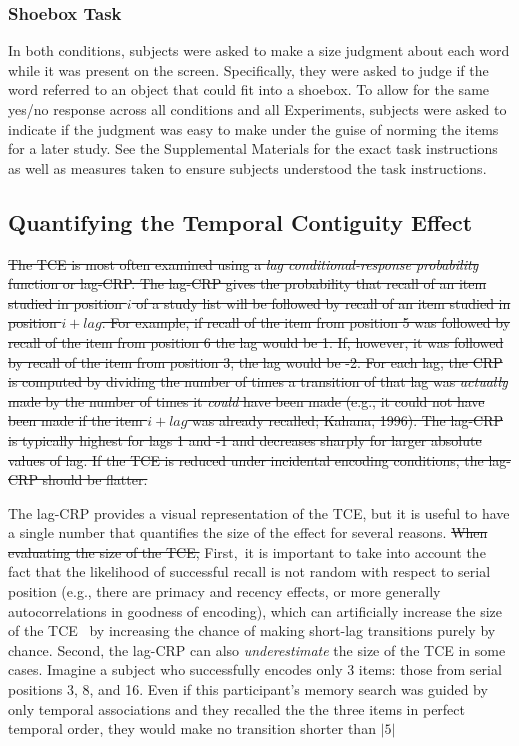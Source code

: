 \documentclass[man,natbib,floatsintext]{apa6} %
\begin{document}
\subsubsection{Shoebox Task} In both conditions, subjects were asked to make a size judgment about each word while it was present on the screen. Specifically, they were asked  to judge if the word referred to an object that could fit into a shoebox. To allow for the same yes/no response across all conditions and all Experiments, subjects were asked to indicate if the judgment was easy to make under the guise of norming the items for a later study. See the Supplemental Materials for the exact task instructions as well as measures taken to ensure subjects understood the task instructions.

\subsection{Quantifying the Temporal Contiguity Effect} \st{The TCE is most often examined using a \textit{lag conditional-response probability} function or lag-CRP. The lag-CRP gives the probability that recall of an item studied in position $i$ of a study list will be followed by recall of an item studied in position $i+lag$. For example, if recall of the item from position 5 was followed by recall of the item from position 6 the lag would be 1. If, however, it was followed by recall of the item from position 3, the lag would be -2. For each lag, the CRP is computed by dividing the number of times a transition of that lag was \emph{actually} made by the number of times it \emph{could} have been made (e.g., it could not have been made if the item $i+lag$ was already recalled; Kahana, 1996). The lag-CRP is typically highest for lags 1 and -1 and decreases sharply for larger absolute values of lag. If the TCE is reduced under incidental encoding conditions, the lag-CRP should be flatter.}

The lag-CRP provides a visual representation of the TCE, but it is useful to have a single number that quantifies the size of the effect for several reasons. \st{When evaluating the size of the TCE,} \color{red}First,\color{black}~it is important to take into account the fact that the likelihood of successful recall is not random with respect to serial position (e.g., there are primacy and recency effects, or more generally autocorrelations in goodness of encoding), which can artificially increase the size of the TCE \citep{HealKaha17,Hint16}\color{red}~by increasing the chance of making short-lag transitions purely by chance. Second, the lag-CRP can also \emph{underestimate} the size of the TCE in some cases. Imagine a subject who successfully encodes only 3 items: those from serial positions 3, 8, and 16. Even if this participant's memory search was guided by only temporal associations and they recalled the the three items in perfect temporal order, they would make no transition shorter than $|5|$ \color{black}
\end{document}
